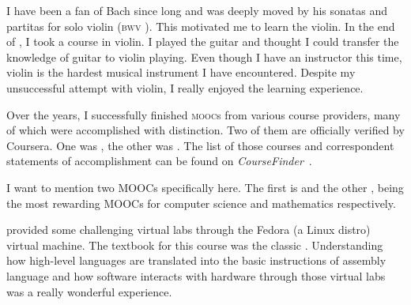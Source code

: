 	I have been a fan of Bach since long and was deeply moved by his sonatas and
	partitas for solo violin (\textsc{bwv} ). This motivated me to
	learn the violin. In the end of , I took a course in violin. I
	played the guitar and thought I could transfer the knowledge of guitar to
	violin playing. Even though I have an instructor this time, violin is the
	hardest musical instrument I have encountered. Despite my unsuccessful attempt
	with violin, I really enjoyed the learning experience.
	
	Over the years, I successfully finished  \textsc{mooc}s from various
	course providers, many of which were accomplished with distinction. Two of them
	are officially verified by Coursera. One was , the other
	was . The list of those  courses and correspondent
	statements of accomplishment can be found on
	\textit{CourseFinder}~\cite{accredible}.
	
	I want to mention two MOOCs specifically here. The first is 
	and the other , being the most rewarding MOOCs for computer
	science and mathematics respectively.
	
	 provided some challenging virtual labs through the Fedora (a
	Linux distro) virtual machine. The textbook for this course was the classic
	. Understanding how high-level languages are translated
	into the basic instructions of assembly language and how software interacts
	with hardware through those virtual labs was a really wonderful experience.
	
	
